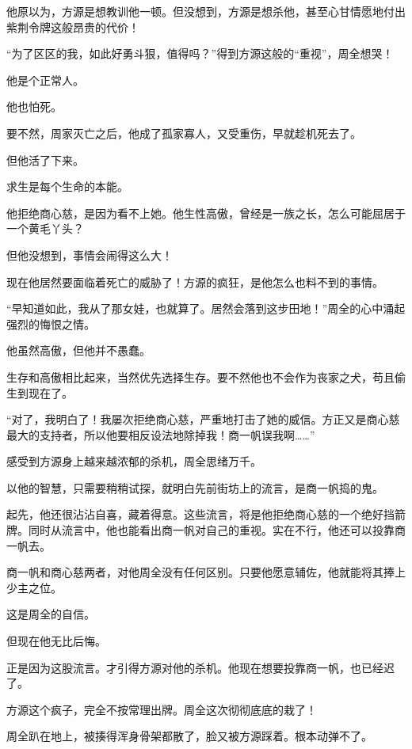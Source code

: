 
\begin{this_body}



他原以为，方源是想教训他一顿。但没想到，方源是想杀他，甚至心甘情愿地付出紫荆令牌这般昂贵的代价！

“为了区区的我，如此好勇斗狠，值得吗？”得到方源这般的“重视”，周全想哭！

他是个正常人。

他也怕死。

要不然，周家灭亡之后，他成了孤家寡人，又受重伤，早就趁机死去了。

但他活了下来。

求生是每个生命的本能。

他拒绝商心慈，是因为看不上她。他生性高傲，曾经是一族之长，怎么可能屈居于一个黄毛丫头？

但他没想到，事情会闹得这么大！

现在他居然要面临着死亡的威胁了！方源的疯狂，是他怎么也料不到的事情。

“早知道如此，我从了那女娃，也就算了。居然会落到这步田地！”周全的心中涌起强烈的悔恨之情。

他虽然高傲，但他并不愚蠢。

生存和高傲相比起来，当然优先选择生存。要不然他也不会作为丧家之犬，苟且偷生到现在了。

“对了，我明白了！我屡次拒绝商心慈，严重地打击了她的威信。方正又是商心慈最大的支持者，所以他要相反设法地除掉我！商一帆误我啊……”

感受到方源身上越来越浓郁的杀机，周全思绪万千。

以他的智慧，只需要稍稍试探，就明白先前街坊上的流言，是商一帆捣的鬼。

起先，他还很沾沾自喜，藏着得意。这些流言，将是他拒绝商心慈的一个绝好挡箭牌。同时从流言中，他也能看出商一帆对自己的重视。实在不行，他还可以投靠商一帆去。

商一帆和商心慈两者，对他周全没有任何区别。只要他愿意辅佐，他就能将其捧上少主之位。

这是周全的自信。

但现在他无比后悔。

正是因为这股流言。才引得方源对他的杀机。他现在想要投靠商一帆，也已经迟了。

方源这个疯子，完全不按常理出牌。周全这次彻彻底底的栽了！

周全趴在地上，被揍得浑身骨架都散了，脸又被方源踩着。根本动弹不了。


\end{this_body}
